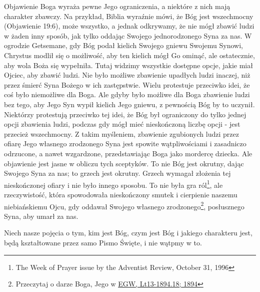 Objawienie Boga wyraża pewne Jego ograniczenia, a niektóre z nich mają charakter zbawczy. Na przykład, Biblia wyraźnie mówi, że Bóg jest wszechmocny (Objawienie 19:6), może wszystko, a jednak odkrywamy, że nie mógł zbawić ludzi w żaden inny sposób, jak tylko oddając Swojego jednorodzonego Syna za nas. W ogrodzie Getsemane, gdy Bóg podał kielich Swojego gniewu Swojemu Synowi, Chrystus modlił się o możliwość, aby ten kielich mógł Go ominąć, ale ostatecznie, aby wola Boża się wypełniła. Tutaj widzimy wszystkie dostępne opcje, jakie miał Ojciec, aby zbawić ludzi. Nie było możliwe zbawienie upadłych ludzi inaczej, niż przez śmierć Syna Bożego w ich zastępstwie. Wielu protestuje przeciwko idei, że coś było niemożliwe dla Boga. Ale gdyby było możliwe dla Boga zbawienie ludzi bez tego, aby Jego Syn wypił kielich Jego gniewu, z pewnością Bóg by to uczynił. Niektórzy protestują przeciwko tej idei, że Bóg był ograniczony do tylko jednej opcji zbawienia ludzi, podczas gdy mógł mieć nieskończoną liczbę opcji - jest przecież wszechmocny. Z takim myśleniem, zbawienie zgubionych ludzi przez ofiarę Jego własnego zrodzonego Syna jest spowite wątpliwościami i zasadniczo odrzucone, a nawet wzgardzone, przedstawiając Boga jako mordercę dziecka. Ale objawienie jest jasne w obliczu tych sceptyków. To nie Bóg jest okrutny, dając Swojego Syna za nas; to grzech jest okrutny. Grzech wymagał złożenia tej nieskończonej ofiary i nie było innego sposobu. To nie była gra ról\footnote{The Week of Prayer issue by the Adventist Review, October 31, 1996}, ale rzeczywistość, która spowodowała nieskończony smutek i cierpienie naszemu niebiańskiemu Ojcu, gdy oddawał Swojego własnego zrodzonego\footnote{Przeczytaj o darze Boga, Jego  w \href{https://egwwritings.org/?ref=en_Lt13-1894.18&para=5486.24}{{EGW, Lt13-1894.18; 1894}}}, posłusznego Syna, aby umarł za nas.

Niech nasze pojęcia o tym, kim jest Bóg, czym jest Bóg i jakiego charakteru jest, będą kształtowane przez samo Pismo Święte, i nie wątpmy w to.

